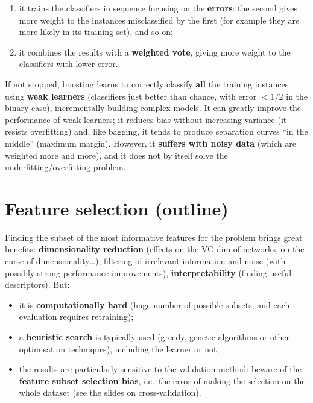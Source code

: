 \begin{enumerate}
\def\labelenumi{\arabic{enumi}.}
\tightlist
\item
  it trains the classifiers in sequence focusing on the
  \textbf{errors}: the second gives more weight to the instances
  misclassified by the first (for example they are more likely in its
  training set), and so on;
\item
  it combines the results with a \textbf{weighted vote}, giving more
  weight to the classifiers with lower error.
\end{enumerate}

If not stopped, boosting learns to correctly classify \textbf{all} the
training instances using \textbf{weak learners} (classifiers just
better than chance, with error \(< 1/2\) in the binary case),
incrementally building complex models. It can greatly improve the
performance of weak learners; it reduces bias without increasing
variance (it resists overfitting) and, like bagging, it tends to
produce separation curves ``in the middle'' (maximum margin). However,
it \textbf{suffers with noisy data} (which are weighted more and more),
and it does not by itself solve the underfitting/overfitting problem.

\section{Feature selection (outline)}\label{feature-selection-cenni}

Finding the subset of the most informative features for the problem
brings great benefits: \textbf{dimensionality reduction} (effects on
the VC-dim of networks, on the curse of dimensionality\ldots),
filtering of irrelevant information and noise (with possibly strong
performance improvements), \textbf{interpretability} (finding useful
descriptors). But:

\begin{itemize}
\tightlist
\item
  it is \textbf{computationally hard} (huge number of possible subsets,
  and each evaluation requires retraining);
\item
  a \textbf{heuristic search} is typically used (greedy, genetic
  algorithms or other optimisation techniques), including the learner
  or not;
\item
  the results are particularly sensitive to the validation method:
  beware of the \textbf{feature subset selection bias}, i.e.\ the error
  of making the selection on the whole dataset (see the slides on
  cross-validation).
\end{itemize}

